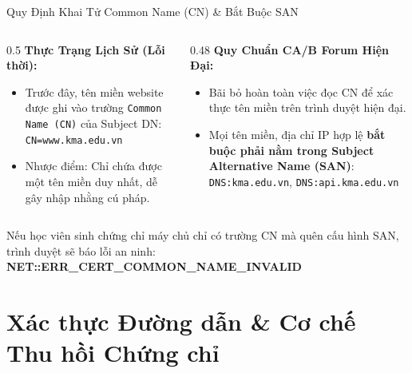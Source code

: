 \begin{frame}{Quy Định Khai Tử Common Name (CN) \& Bắt Buộc SAN}
  \begin{columns}[T]
    \begin{column}{0.5\textwidth}
      \textbf{Thực Trạng Lịch Sử (Lỗi thời):}
      \begin{itemize}\small
        \item Trước đây, tên miền website được ghi vào trường \texttt{Common Name (CN)} của Subject DN:
        \texttt{CN=www.kma.edu.vn}
        \item Nhược điểm: Chỉ chứa được một tên miền duy nhất, dễ gây nhập nhằng cú pháp.
      \end{itemize}
    \end{column}
    \begin{column}{0.48\textwidth}
      \textbf{Quy Chuẩn CA/B Forum Hiện Đại:}
      \begin{itemize}\small
        \item Bãi bỏ hoàn toàn việc đọc CN để xác thực tên miền trên trình duyệt hiện đại.
        \item Mọi tên miền, địa chỉ IP hợp lệ \textbf{bắt buộc phải nằm trong Subject Alternative Name (SAN)}:
        \texttt{DNS:kma.edu.vn}, \texttt{DNS:api.kma.edu.vn}
      \end{itemize}
    \end{column}
  \end{columns}

  \begin{quizbox}
    Nếu học viên sinh chứng chỉ máy chủ chỉ có trường CN mà quên cấu hình SAN, trình duyệt sẽ báo lỗi an ninh:
    \textbf{\color{warnred}NET::ERR\_CERT\_COMMON\_NAME\_INVALID}
  \end{quizbox}
\end{frame}

\section{Xác thực Đường dẫn \& Cơ chế Thu hồi Chứng chỉ}

